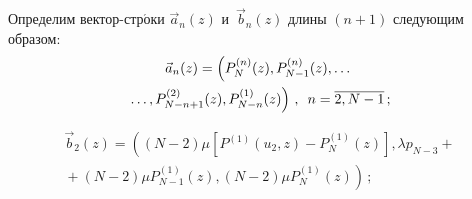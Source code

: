 \begin{multicols}{2}
\noindent
Определим вектор-стр$\acute{\mbox{о}}$\-ки $\vec{a}_n(z)$ и~$\vec{b}_n(z)$
длины $(n+1)$ следующим образом:
\begin{multline*}
\vec{a}_n(z) = \left (
P^{(n)}_{N}(z), P^{(n)}_{N-1}(z), \dots\right.\\
\left.\dots,  P^{(2)}_{N-n+1}(z), P^{(1)}_{N-n}(z)
\right )\,,\enskip
n =\overline{2,N-1}\,;
\end{multline*}

\vspace*{-12pt}
\noindent
\begin{multline*}
\vec{b}_2(z) = \left (
(N-2) \mu [P^{(1)}(u_2,z) - P^{(1)}_{N}(z)] ,
\lambda p_{N-3}+{}\right.\\
\left.{}+ (N-2) \mu P^{(1)}_{N-1}(z),
(N-2) \mu P^{(1)}_{N}(z) \right)\,;
\end{multline*}

\vspace*{-12pt}


\end{multicols}
